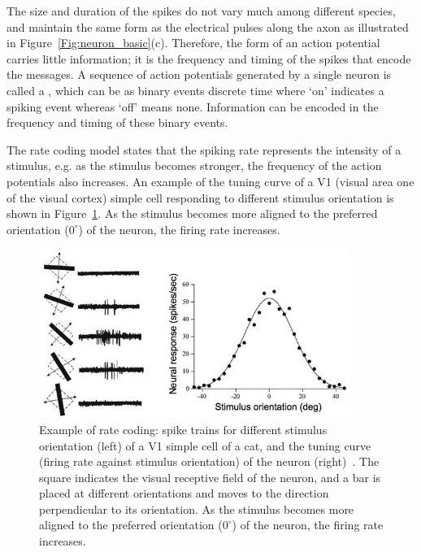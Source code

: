 The size and duration of the spikes do not vary much among different species, and maintain the same form as the electrical pulses \DIFdelbegin {}\DIFdelend \DIFaddbegin {}\DIFaddend along the axon as illustrated in Figure~\ref{Fig:neuron_basic}(c).
Therefore, the form of an action potential carries little information;
it is the frequency and timing of the spikes that encode the messages.
A sequence of action potentials generated by a single neuron is called a \DIFdelbegin {}\DIFdelend \DIFaddbegin {}\textbf{}\DIFaddend , which can be \DIFdelbegin {}\DIFdelend \DIFaddbegin {}\DIFaddend as binary events \DIFdelbegin {}\DIFdelend \DIFaddbegin {}\DIFaddend discrete time where `on' indicates a spiking event \DIFaddbegin {}\DIFaddend whereas `off' means none.
Information can be encoded in the frequency and timing of these binary events.


The rate coding model states that the spiking rate represents the intensity of a stimulus, e.g. as the stimulus becomes stronger, the frequency of the action potentials also increases.
An example of the tuning curve of a V1 (visual area one of the visual cortex) simple cell responding to different stimulus orientation is shown in Figure~\ref{Fig:v1}.
As the stimulus becomes more aligned to the preferred orientation ($0^\circ$) of the neuron, the firing rate increases.

\begin{figure}[bt]
	\centering
	\includegraphics[width=0.9\textwidth]{pics_snn/v1.jpg}
	\caption{Example of rate coding: spike trains for different stimulus orientation (left) of a V1 simple cell of a cat, and the tuning curve (firing rate against stimulus orientation) of the neuron (right)~\citep{hubel1962receptive}.
	The square indicates the visual receptive field of the neuron, and a bar is placed at different orientations and moves to the direction perpendicular to its orientation.
    As the stimulus becomes more aligned to the preferred orientation ($0^\circ$) of the neuron, the firing rate increases.}
	\label{Fig:v1}
\end{figure}

